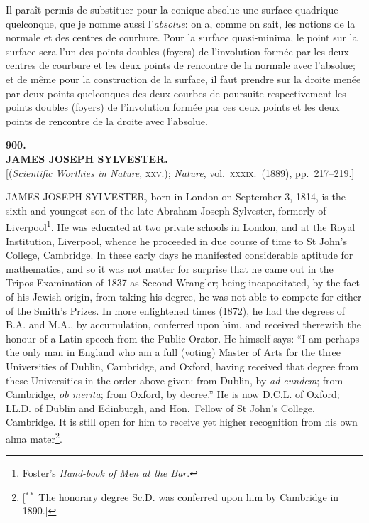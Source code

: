 \documentclass[11pt,a4paper]{article}
\begin{document}
Il paraît permis de substituer pour la conique absolue une surface quadrique quelconque, que je nomme aussi l'\emph{absolue}: on a, comme on sait, les notions de la normale et des centres de courbure. Pour la surface quasi-minima, le point sur la surface sera l'un des points doubles (foyers) de l'involution formée par les deux centres de courbure et les deux points de rencontre de la normale avec l'absolue; et de même pour la construction de la surface, il faut prendre sur la droite menée par deux points quelconques des deux courbes de poursuite respectivement les points doubles (foyers) de l'involution formée par ces deux points et les deux points de rencontre de la droite avec l'absolue.

\clearpage

\begin{center}
{\large\bfseries 900.}\\[0.5em]
{\large\bfseries JAMES JOSEPH SYLVESTER.}\\[0.5em]
\small [(\emph{Scientific Worthies in Nature}, \textsc{xxv}.); \emph{Nature}, vol.\ \textsc{xxxix}.\ (1889), pp.\ 217--219.]
\end{center}
\medskip

\noindent JAMES JOSEPH SYLVESTER, born in London on September 3, 1814, is the sixth and youngest son of the late Abraham Joseph Sylvester, formerly of Liverpool\footnote{Foster's \emph{Hand-book of Men at the Bar}.}. He was educated at two private schools in London, and at the Royal Institution, Liverpool, whence he proceeded in due course of time to St John's College, Cambridge. In these early days he manifested considerable aptitude for mathematics, and so it was not matter for surprise that he came out in the Tripos Examination of 1837 as Second Wrangler; being incapacitated, by the fact of his Jewish origin, from taking his degree, he was not able to compete for either of the Smith's Prizes. In more enlightened times (1872), he had the degrees of B.A. and M.A., by accumulation, conferred upon him, and received therewith the honour of a Latin speech from the Public Orator. He himself says: ``I am perhaps the only man in England who am a full (voting) Master of Arts for the three Universities of Dublin, Cambridge, and Oxford, having received that degree from these Universities in the order above given: from Dublin, by \emph{ad eundem}; from Cambridge, \emph{ob merita}; from Oxford, by decree.'' He is now D.C.L. of Oxford; LL.D. of Dublin and Edinburgh, and Hon.\ Fellow of St John's College, Cambridge. It is still open for him to receive yet higher recognition from his own alma mater\footnote{[$^{**}$ The honorary degree Sc.D. was conferred upon him by Cambridge in 1890.]}.
\end{document}
